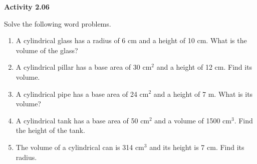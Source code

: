 \vspace{0.3ex}
\noindent\textbf{Activity 2.06}

\vspace{0.2ex}


Solve the following word problems. 

\begin{enumerate}[noitemsep, label = \color{blue}\arabic*. ]
    \item A cylindrical glass has a radius of 6 cm and a height of 10 cm. What is the volume of the glass?
    \item A cylindrical pillar has a base area of 30 cm\(^{2}\) and a height of 12 cm. Find its volume.
    \item A cylindrical pipe has a base area of 24 cm\(^{2}\) and a height of 7 m. What is its volume?
    \item A cylindrical tank has a base area of 50 cm\(^{2}\) and a volume of 1500 cm\(^{3}\). Find the height of the tank.
    \item The volume of a cylindrical can is 314 cm\(^{3}\) and its height is 7 cm. Find its radius.
\end{enumerate}


